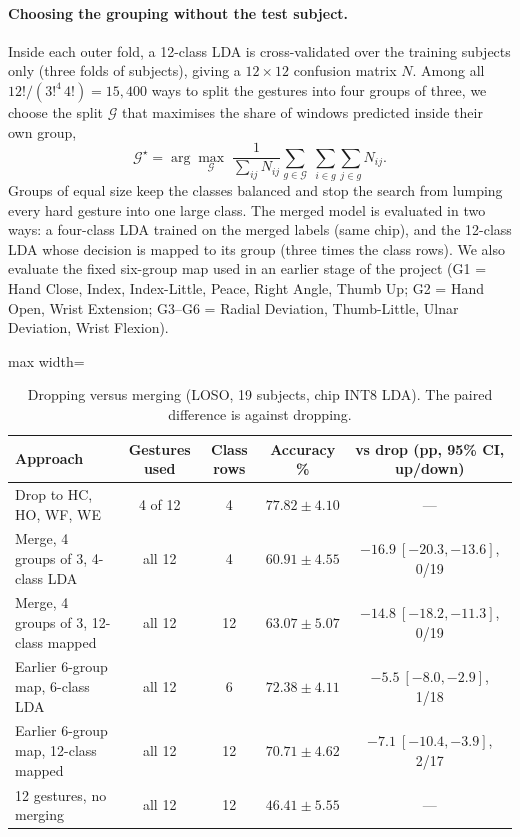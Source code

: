 \documentclass[11pt,a4paper]{article}
\newcommand{\hl}{\rowcolor{chosen}}
\begin{document}
\paragraph{Choosing the grouping without the test subject.} Inside each outer fold, a 12-class LDA is
cross-validated over the training subjects only (three folds of subjects), giving a $12\times12$ confusion
matrix $N$. Among all $12!/(3!^4\,4!)=15{,}400$ ways to split the gestures into four groups of three, we
choose the split $\mathcal{G}$ that maximises the share of windows predicted inside their own group,
\begin{equation}
\mathcal{G}^\star=\arg\max_{\mathcal{G}}\;\frac{1}{\sum_{ij}N_{ij}}\sum_{g\in\mathcal{G}}\;\sum_{i\in g}\sum_{j\in g}N_{ij}.
\end{equation}
Groups of equal size keep the classes balanced and stop the search from lumping every hard gesture into one
large class. The merged model is evaluated in two ways: a four-class LDA trained on the merged labels (same
chip), and the 12-class LDA whose decision is mapped to its group (three times the class rows). We also
evaluate the fixed six-group map used in an earlier stage of the project (G1 = Hand Close, Index,
Index-Little, Peace, Right Angle, Thumb Up; G2 = Hand Open, Wrist Extension; G3--G6 = Radial Deviation,
Thumb-Little, Ulnar Deviation, Wrist Flexion).

\begin{table}[t]\centering\small
\caption{Dropping versus merging (LOSO, 19 subjects, chip INT8 LDA). The paired difference is against
dropping.}\label{tab:merge}
\begin{adjustbox}{max width=\textwidth}
\begin{tabular}{lcccc}\toprule
Approach & Gestures used & Class rows & Accuracy \% & vs drop (pp, 95\% CI, up/down)\\\midrule
\hl Drop to HC, HO, WF, WE & 4 of 12 & 4 & $77.82\pm4.10$ & ---\\
Merge, 4 groups of 3, 4-class LDA & all 12 & 4 & $60.91\pm4.55$ & $-16.9\ [-20.3,-13.6]$, 0/19\\
Merge, 4 groups of 3, 12-class mapped & all 12 & 12 & $63.07\pm5.07$ & $-14.8\ [-18.2,-11.3]$, 0/19\\
Earlier 6-group map, 6-class LDA & all 12 & 6 & $72.38\pm4.11$ & $-5.5\ [-8.0,-2.9]$, 1/18\\
Earlier 6-group map, 12-class mapped & all 12 & 12 & $70.71\pm4.62$ & $-7.1\ [-10.4,-3.9]$, 2/17\\
12 gestures, no merging & all 12 & 12 & $46.41\pm5.55$ & ---\\\bottomrule
\end{tabular}
\end{adjustbox}
\end{table}
\end{document}
